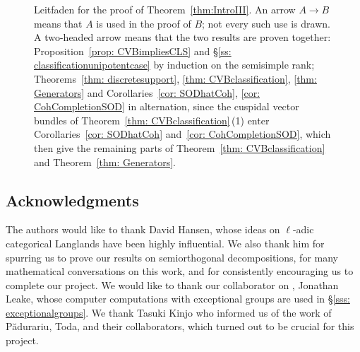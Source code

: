 \documentclass{amsart}
\theoremstyle{definition}
\theoremstyle{remark}
\numberwithin{equation}{section}
\newcommand{\Par}{\mathrm{Par}}
\newcommand{\Coh}{\mathrm{Coh}}
\newcommand{\V}{\mathbb{V}}
\newcommand{\T}{\mathbb{T}}
\begin{document}
\begin{figure}[htbp]
\caption{Leitfaden for the proof of Theorem~\ref{thm:IntroIII}. An arrow $A\to B$ means that $A$ is used in the proof of $B$; not every such use is drawn. A two-headed arrow means that the two results are proven together: Proposition~\ref{prop: CVBimpliesCLS} and \S\ref{ss: classificationunipotentcase} by induction on the semisimple rank; Theorems~\ref{thm: discretesupport}, \ref{thm: CVBclassification}, \ref{thm: Generators} and Corollaries~\ref{cor: SODhatCoh}, \ref{cor: CohCompletionSOD} in alternation, since the cuspidal vector bundles of Theorem~\ref{thm: CVBclassification}\,(1) enter Corollaries~\ref{cor: SODhatCoh} and~\ref{cor: CohCompletionSOD}, which then give the remaining parts of Theorem~\ref{thm: CVBclassification} and Theorem~\ref{thm: Generators}.}
\label{fig: leitfaden}
\end{figure}

\FloatBarrier

\subsection*{Acknowledgments}
The authors would like to thank David Hansen, whose ideas on $\ell$-adic categorical Langlands have been highly influential. We also thank him for spurring us to prove our results on semiorthogonal decompositions, for many mathematical conversations on this work, and for consistently encouraging us to complete our project. We would like to thank our collaborator on \cite{BMKL}, Jonathan Leake, whose computer computations with exceptional groups are used in \S \ref{sss: exceptionalgroups}. We thank Tasuki Kinjo who informed us of the work of P{\u{a}}durariu, Toda, and their collaborators, which turned out to be crucial for this project. 
\end{document}
